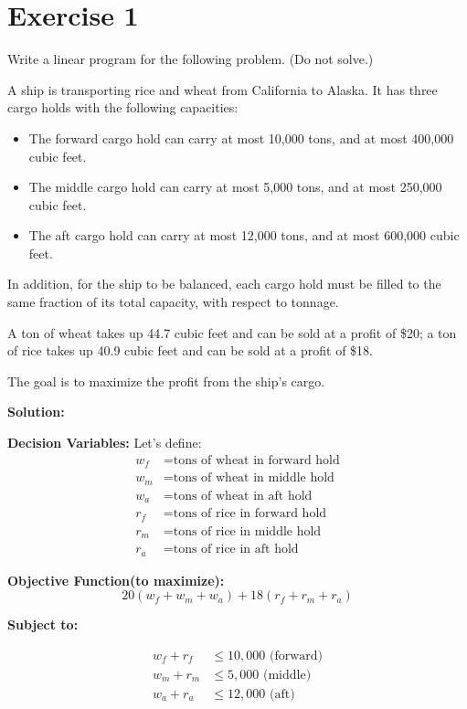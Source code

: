 \documentclass{article}
\begin{document}
\section*{Exercise 1}
Write a linear program for the following problem. (Do not solve.)

A ship is transporting rice and wheat from California to Alaska. It has three cargo holds with the following capacities:
\begin{itemize}
\item The forward cargo hold can carry at most 10,000 tons, and at most 400,000 cubic feet.
\item The middle cargo hold can carry at most 5,000 tons, and at most 250,000 cubic feet.
\item The aft cargo hold can carry at most 12,000 tons, and at most 600,000 cubic feet.
\end{itemize}

In addition, for the ship to be balanced, each cargo hold must be filled to the same fraction of its total capacity, with respect to tonnage.

A ton of wheat takes up 44.7 cubic feet and can be sold at a profit of \$20; a ton of rice takes up 40.9 cubic feet and can be sold at a profit of \$18.

The goal is to maximize the profit from the ship's cargo.

\textbf{Solution: }

\textbf{Decision Variables:}
Let's define:
\begin{align*}
w_f &= \text{tons of wheat in forward hold} \\
w_m &= \text{tons of wheat in middle hold} \\
w_a &= \text{tons of wheat in aft hold} \\
r_f &= \text{tons of rice in forward hold} \\
r_m &= \text{tons of rice in middle hold} \\
r_a &= \text{tons of rice in aft hold}
\end{align*}

\textbf{Objective Function(to maximize):}
\[ 20(w_f + w_m + w_a) + 18(r_f + r_m + r_a) \]

\textbf{Subject to:}

\begin{align*}
w_f + r_f &\leq 10,000 \text{ (forward)} \\
w_m + r_m &\leq 5,000 \text{ (middle)} \\
w_a + r_a &\leq 12,000 \text{ (aft)}
\end{align*}
\end{document}
